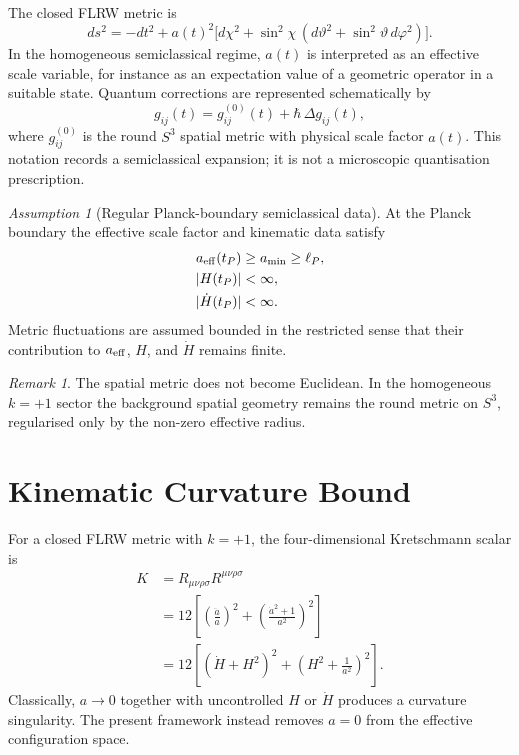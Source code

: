 \documentclass[reprint,aps,prd,letterpaper,superscriptaddress,nofootinbib,longbibliography,floatfix]{revtex4-2}
\theoremstyle{remark}
\newtheorem{remark}[theorem]{Remark}
\newtheorem{assumption}[theorem]{Assumption}
\begin{document}
The closed FLRW metric is
\[
  ds^2=-dt^2+a(t)^2
  \bigl[d\chi^2+\sin^2\chi\,(d\vartheta^2+\sin^2\vartheta\,d\varphi^2)\bigr].
\]
In the homogeneous semiclassical regime, \(a(t)\) is interpreted as an effective
scale variable, for instance as an expectation value of a geometric operator in
a suitable state.  Quantum corrections are represented schematically by
\[
  g_{ij}(t)=g^{(0)}_{ij}(t)+\hbar\,\Delta g_{ij}(t),
\]
where \(g^{(0)}_{ij}\) is the round \(S^3\) spatial metric with physical scale
factor \(a(t)\).  This notation records a semiclassical expansion; it is not a
microscopic quantisation prescription.

\begin{assumption}[Regular Planck-boundary semiclassical data]
\label{ass:regular-data}
At the Planck boundary the effective scale factor and kinematic data satisfy
\[
\begin{aligned}
  a_{\rm eff}(t_P)&\ge a_{\rm min}\ge \ell_P,\\
  |H(t_P)|&<\infty,\\
  |\dot H(t_P)|&<\infty .
\end{aligned}
\]
Metric fluctuations are assumed bounded in the restricted sense that their
contribution to \(a_{\rm eff}\), \(H\), and \(\dot H\) remains finite.
\end{assumption}

\begin{remark}
The spatial metric does not become Euclidean.  In the homogeneous \(k=+1\)
sector the background spatial geometry remains the round metric on \(S^3\),
regularised only by the non-zero effective radius.
\end{remark}

\section{Kinematic Curvature Bound}
\label{sec:curvature}

For a closed FLRW metric with \(k=+1\), the four-dimensional Kretschmann scalar is
\[
\begin{aligned}
  K
  &=R_{\mu\nu\rho\sigma}R^{\mu\nu\rho\sigma}  \\
  &=12\left[
      \left(\frac{\ddot a}{a}\right)^2
      +\left(\frac{\dot a^2+1}{a^2}\right)^2
    \right]                                      \\
  &=12\left[
      (\dot H+H^2)^2
      +\left(H^2+\frac1{a^2}\right)^2
    \right].
\end{aligned}
\]
Classically, \(a\to0\) together with uncontrolled \(H\) or \(\dot H\) produces a
curvature singularity.  The present framework instead removes \(a=0\) from the
effective configuration space.
\end{document}
